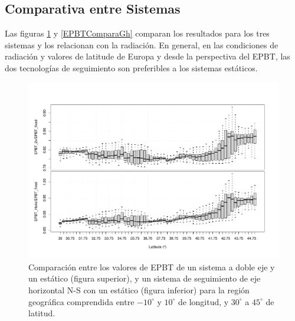 \subsection{Comparativa entre Sistemas}


Las figuras \ref{EPBTComparaBoxPlot} y \ref{EPBTComparaGh} comparan
los resultados para los tres sistemas y los relacionan con la
radiación. En general, en las condiciones de radiación y valores de
latitude de Europa y desde la perspectiva del EPBT, las dos
tecnologías de seguimiento son preferibles a los sistemas estáticos.

\begin{figure}[p]
\begin{centering}
\includegraphics[height=0.38\textheight]{../figs/BoxPlotEPBTEuropa_SODA004}
\par\end{centering}

\caption{\label{EPBTComparaBoxPlot}Comparación entre los valores de
  EPBT de un sistema a doble eje y un estático (figura superior), y un
  sistema de seguimiento de eje horizontal N-S con un estático (figura
  inferior) para la región geográfica comprendida entre $-10^{\circ}$
  y $10^{\circ}$ de longitud, y $30^{\circ}$ a $45^{\circ}$ de
  latitud.}
\end{figure}


